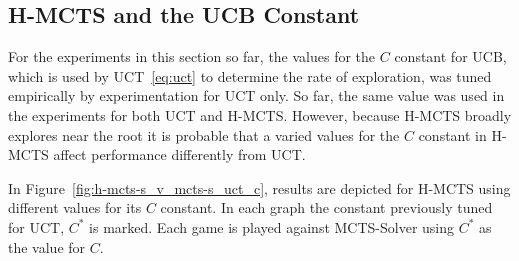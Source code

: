 \documentclass{kecsmstr}
\begin{document}
\begin{table}[ht]
\centering
\captionsetup{justification=centering,margin=1cm}
\tabcolsep=0.3cm
\vspace{3mm}
{\caption[H-MCTS with Upper/Lower Bounds vs. UCT.]{H-MCTS with Upper/Lower Bounds vs. UCT, random play-outs.\\ Win percentages with respect to H-MCTS, 1,000 games.} \label{tab:hmcts_ublb}}
\end{table}

\subsection{H-MCTS and the UCB Constant}
\label{subsubsec:h-mcts_c}

For the experiments in this section so far, the values for the $C$ constant for UCB, which is used by UCT~\ref{eq:uct} to determine the rate of exploration, was tuned empirically by experimentation for UCT only. So far, the same value was used in the experiments for both UCT and H-MCTS. However, because H-MCTS broadly explores near the root it is probable that a varied values for the $C$ constant in H-MCTS affect performance differently from UCT.



In Figure~\ref{fig:h-mcts-s_v_mcts-s_uct_c}, results are depicted for H-MCTS using different values for its $C$ constant. In each graph the constant previously tuned for UCT, $C^*$ is marked. Each game is played against MCTS-Solver using $C^*$ as the value for $C$.
\end{document}
